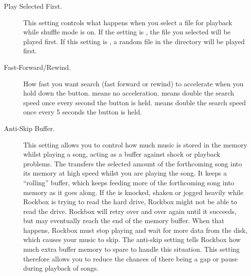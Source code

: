 \begin{description}
\item[Play Selected First. ]This setting controls what happens when you
  select a file for playback while shuffle mode is on. If the
   setting is , the file you
  selected will be played first. If this setting is , a random
  file in the directory will be played first.

  \item[Fast-Forward/Rewind. ]How fast you want search (fast forward or rewind)
    to accelerate when you hold down the button.  means no 
    acceleration.  means double the search speed once every 
    second the button is held.  means double the search speed 
    once every 5 seconds the button is held.

  \item[Anti-Skip Buffer. ]This setting allows you to control how much music is
    stored in the \daps{} memory whilst playing a song, acting as a buffer
    against shock or playback problems. The \dap{} transfers the selected
    amount of the forthcoming song into its memory at high speed whilst you are
    playing the song. It keeps a ``rolling'' buffer, which keeps feeding more
    of the forthcoming song into memory as it goes along.
    If the \dap{} is knocked, shaken or jogged heavily while Rockbox is trying
    to read the hard drive, Rockbox might not be able to read the drive.
    Rockbox will retry over and over again until it succeeds, but may
    eventually reach the end of the memory buffer. When that happens, Rockbox
    must stop playing and wait for more data from the disk, which causes your
    music to skip. The anti-skip setting tells Rockbox how much extra buffer
    memory to spare to handle this situation. This setting therefore allows you
    to reduce the chances of there being a gap or pause during playback of
    songs.
    
    
    

\end{description}
